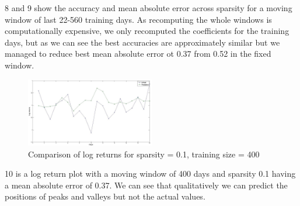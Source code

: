\figurename{8} and \figurename{9} show the accuracy and mean absolute error across sparsity for a moving window of last 22-560 training days. As recomputing the whole windows is computationally expensive, we only recomputed the coefficients for the training days, but as we can see the best accuracies are approximately similar but we managed to reduce best mean absolute error ot 0.37 from 0.52 in the fixed window.

\begin{figure}[h!]
	\includegraphics[width=0.5\textwidth]{results/prediction.jpg}
	\caption{Comparison of log returns for sparsity = 0.1, training size = 400}
\end{figure}

\figurename{10} is a log return plot with a moving window of 400 days and sparsity 0.1 having a mean absolute error of 0.37. We can see that qualitatively we can predict the positions of peaks and valleys but not the actual values.



